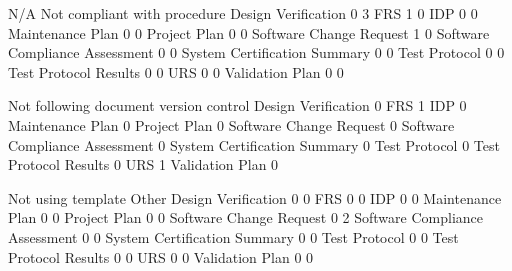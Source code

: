 \documentclass{article}
\begin{document}
\begin{Schunk}
\begin{Soutput}
                                 N/A Not compliant with procedure
  Design Verification              0                            3
  FRS                              1                            0
  IDP                              0                            0
  Maintenance Plan                 0                            0
  Project Plan                     0                            0
  Software Change Request          1                            0
  Software Compliance Assessment   0                            0
  System Certification Summary     0                            0
  Test Protocol                    0                            0
  Test Protocol Results            0                            0
  URS                              0                            0
  Validation Plan                  0                            0
                                
                                 Not following document version control
  Design Verification                                                 0
  FRS                                                                 1
  IDP                                                                 0
  Maintenance Plan                                                    0
  Project Plan                                                        0
  Software Change Request                                             0
  Software Compliance Assessment                                      0
  System Certification Summary                                        0
  Test Protocol                                                       0
  Test Protocol Results                                               0
  URS                                                                 1
  Validation Plan                                                     0
                                
                                 Not using template Other
  Design Verification                             0     0
  FRS                                             0     0
  IDP                                             0     0
  Maintenance Plan                                0     0
  Project Plan                                    0     0
  Software Change Request                         0     2
  Software Compliance Assessment                  0     0
  System Certification Summary                    0     0
  Test Protocol                                   0     0
  Test Protocol Results                           0     0
  URS                                             0     0
  Validation Plan                                 0     0
                                

\end{Soutput}
\end{Schunk}
\end{document}

